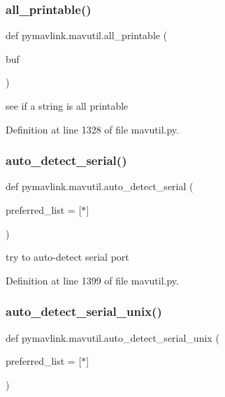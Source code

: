 \subsubsection{\texorpdfstring{all\_printable()}{all\_printable()}}
{\footnotesize\ttfamily def pymavlink.\+mavutil.\+all\+\_\+printable (\begin{DoxyParamCaption}\item[{}]{buf }\end{DoxyParamCaption})}

\begin{DoxyVerb}see if a string is all printable\end{DoxyVerb}
 

Definition at line 1328 of file mavutil.\+py.

\mbox{\label{namespacepymavlink_1_1mavutil_a256e344d1870c0a938cac5b21d3003be}} 
\subsubsection{\texorpdfstring{auto\_detect\_serial()}{auto\_detect\_serial()}}
{\footnotesize\ttfamily def pymavlink.\+mavutil.\+auto\+\_\+detect\+\_\+serial (\begin{DoxyParamCaption}\item[{}]{preferred\+\_\+list = {\ttfamily \mbox{[}\textquotesingle{}$\ast$\textquotesingle{}\mbox{]}} }\end{DoxyParamCaption})}

\begin{DoxyVerb}try to auto-detect serial port\end{DoxyVerb}
 

Definition at line 1399 of file mavutil.\+py.

\mbox{\label{namespacepymavlink_1_1mavutil_a25cdb766d4635c7ca2e491614b6d87c7}} 
\subsubsection{\texorpdfstring{auto\_detect\_serial\_unix()}{auto\_detect\_serial\_unix()}}
{\footnotesize\ttfamily def pymavlink.\+mavutil.\+auto\+\_\+detect\+\_\+serial\+\_\+unix (\begin{DoxyParamCaption}\item[{}]{preferred\+\_\+list = {\ttfamily \mbox{[}\textquotesingle{}$\ast$\textquotesingle{}\mbox{]}} }\end{DoxyParamCaption})}


